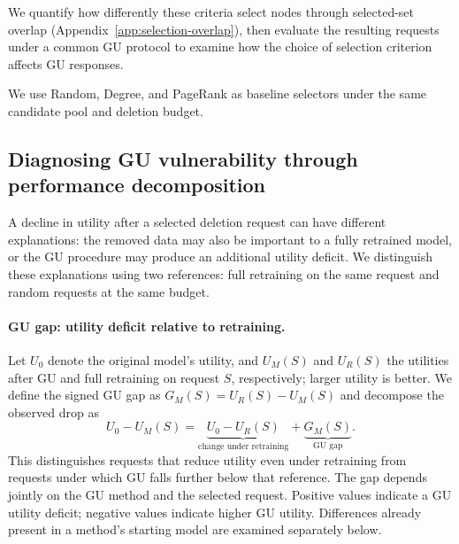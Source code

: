 We quantify how differently these criteria select nodes through selected-set overlap (Appendix~\ref{app:selection-overlap}), then evaluate the resulting requests under a common GU protocol to examine how the choice of selection criterion affects GU responses.

We use Random, Degree, and PageRank as baseline selectors under the same candidate pool and deletion budget.


\subsection{Diagnosing GU vulnerability through performance decomposition}
\label{sec:decomposition}
A decline in utility after a selected deletion request can have different explanations: the removed data may also be important to a fully retrained model, or the GU procedure may produce an additional utility deficit. We distinguish these explanations using two references: full retraining on the same request and random requests at the same budget.

\paragraph{GU gap: utility deficit relative to retraining.}
Let $U_0$ denote the original model's utility, and $U_M(S)$ and $U_R(S)$ the utilities after GU and full retraining on request $S$, respectively; larger utility is better. We define the signed GU gap as $G_M(S)=U_R(S)-U_M(S)$ and decompose the observed drop as
\begin{equation}
U_0-U_M(S)
=\underbrace{U_0-U_R(S)}_{\text{change under retraining}}
+\underbrace{G_M(S)}_{\text{GU gap}}.
\label{eq:retrain-decomposition}
\end{equation}
This distinguishes requests that reduce utility even under retraining from requests under which GU falls further below that reference. The gap depends jointly on the GU method and the selected request. Positive values indicate a GU utility deficit; negative values indicate higher GU utility. Differences already present in a method's starting model are examined separately below.

